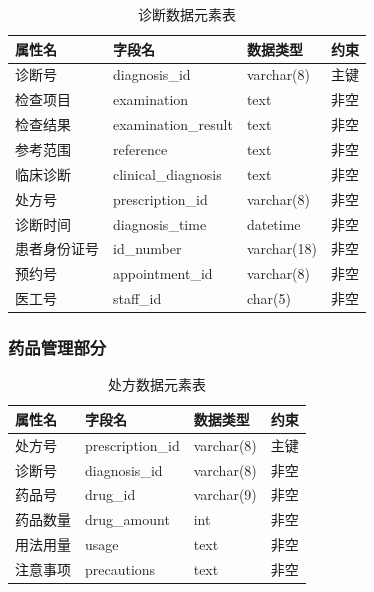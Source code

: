 \documentclass{article}
\begin{document}
\begin{table}[H]
    \centering
    \begin{tabularx}{\textwidth}{|>{\raggedright\arraybackslash}X|>{\raggedright\arraybackslash}X|>{\raggedright\arraybackslash}X|>{\raggedright\arraybackslash}X|}
    \toprule
    \textbf{属性名} & \textbf{字段名} & \textbf{数据类型} & \textbf{约束} \\ \midrule
    诊断号 & diagnosis\_id & varchar(8) & 主键 \\ \midrule
    检查项目 & examination & text & 非空 \\ \midrule
    检查结果 & examination\_result & text & 非空 \\ \midrule
    参考范围 & reference & text & 非空 \\ \midrule
    临床诊断 & clinical\_diagnosis & text & 非空 \\ \midrule
    处方号 & prescription\_id & varchar(8) & 非空 \\ \midrule
    诊断时间 & diagnosis\_time & datetime & 非空 \\ \midrule
    患者身份证号 & id\_number & varchar(18) & 非空 \\ \midrule
    预约号 & appointment\_id & varchar(8) & 非空 \\ \midrule
    医工号 & staff\_id & char(5) & 非空 \\ \bottomrule
    \end{tabularx}
    \caption{诊断数据元素表}
    \label{tab:diagnosis_elements}
\end{table}

\subsubsection{药品管理部分}

\begin{table}[H]
    \centering
    \begin{tabularx}{\textwidth}{|>{\raggedright\arraybackslash}X|>{\raggedright\arraybackslash}X|>{\raggedright\arraybackslash}X|>{\raggedright\arraybackslash}X|}
    \toprule
    \textbf{属性名} & \textbf{字段名} & \textbf{数据类型} & \textbf{约束} \\ \midrule
    处方号 & prescription\_id & varchar(8) & 主键 \\ \midrule
    诊断号 & diagnosis\_id & varchar(8) & 非空\\ \midrule
    药品号 & drug\_id & varchar(9) & 非空 \\ \midrule
    药品数量 & drug\_amount & int & 非空 \\ \midrule
    用法用量 & usage & text & 非空 \\ \midrule
    注意事项 & precautions & text & 非空 \\ \bottomrule
    \end{tabularx}
    \caption{处方数据元素表}
    \label{tab:prescription_elements}
\end{table}
\end{document}
